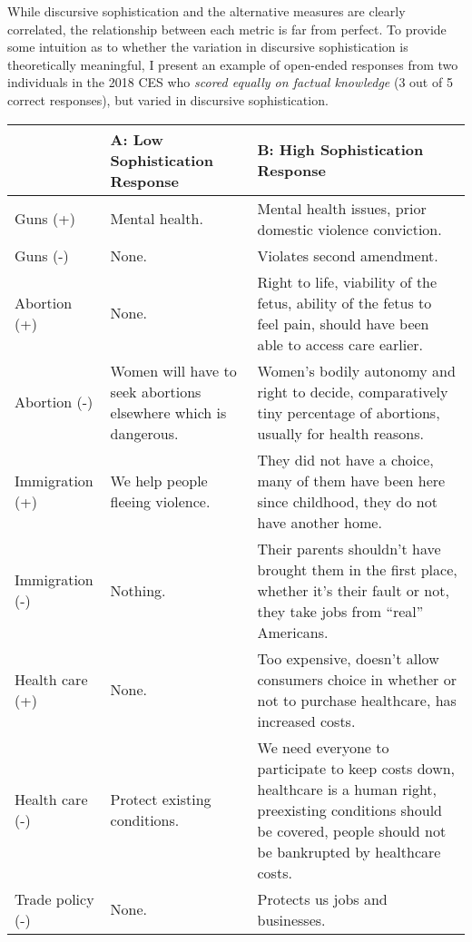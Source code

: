 While discursive sophistication and the alternative measures are clearly correlated, the relationship between each metric is far from perfect. To provide some intuition as to whether the variation in discursive sophistication is theoretically meaningful, I present an example of open-ended responses from two individuals in the 2018 CES who \textit{scored equally on factual knowledge} (3 out of 5 correct responses), but varied in discursive sophistication. 

\begin{table}[ht]\footnotesize\centering
\begin{tabular}{l|p{5.0cm}|p{7.6cm}}
\toprule
					& A: Low Sophistication Response 
					& B: High Sophistication Response
					\\\midrule
Guns (+)			& Mental health.
					& Mental health issues, prior domestic violence conviction.
					\\\hdashline
Guns (-)			& None.
					& Violates second amendment.
					\\\hdashline
Abortion (+)		& None.
					& Right to life, viability of the fetus, ability of the fetus to feel pain, should have been able to access care earlier.
					\\\hdashline
Abortion (-)		& Women will have to seek abortions elsewhere which is dangerous.
					& Women's bodily autonomy and right to decide, comparatively tiny percentage of abortions, usually for health reasons.
					\\\hdashline
Immigration (+)		& We help people fleeing violence.
					& They did not have a choice, many of them have been here since childhood, they do not have another home.
					\\\hdashline
Immigration (-)		& Nothing.
					& Their parents shouldn't have brought them in the first place, whether it’s their fault or not, they take jobs from ``real'' Americans.
					\\\hdashline
Health care (+)		& None.
					& Too expensive, doesn't allow consumers choice in whether or not to purchase healthcare, has increased costs.
					\\\hdashline
Health care (-)		& Protect existing conditions.
					& We need everyone to participate to keep costs down, healthcare is a human right, preexisting conditions should be covered, people should not be bankrupted by healthcare costs.
					\\\hdashline
Trade policy (-)	& None.
					& Protects us jobs and businesses.
					

\end{tabular}
\end{table}
